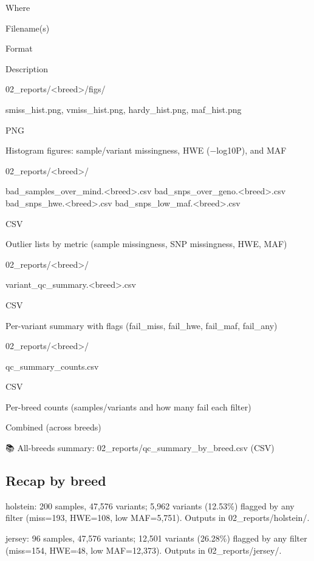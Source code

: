 \documentclass[
]{article}
\begin{document}
Where

Filename(s)

Format

Description

02\_reports/\textless breed\textgreater/figs/

smiss\_hist.png, vmiss\_hist.png, hardy\_hist.png, maf\_hist.png

PNG

Histogram figures: sample/variant missingness, HWE (−log10P), and MAF

02\_reports/\textless breed\textgreater/

bad\_samples\_over\_mind.\textless breed\textgreater.csv
bad\_snps\_over\_geno.\textless breed\textgreater.csv
bad\_snps\_hwe.\textless breed\textgreater.csv
bad\_snps\_low\_maf.\textless breed\textgreater.csv

CSV

Outlier lists by metric (sample missingness, SNP missingness, HWE, MAF)

02\_reports/\textless breed\textgreater/

variant\_qc\_summary.\textless breed\textgreater.csv

CSV

Per-variant summary with flags (fail\_miss, fail\_hwe, fail\_maf,
fail\_any)

02\_reports/\textless breed\textgreater/

qc\_summary\_counts.csv

CSV

Per-breed counts (samples/variants and how many fail each filter)

Combined (across breeds)

📚 All-breeds summary: 02\_reports/qc\_summary\_by\_breed.csv (CSV)

\subsection{Recap by breed}\label{recap-by-breed}

holstein: 200 samples, 47,576 variants; 5,962 variants (12.53\%) flagged
by any filter (miss=193, HWE=108, low MAF=5,751). Outputs in
02\_reports/holstein/.

jersey: 96 samples, 47,576 variants; 12,501 variants (26.28\%) flagged
by any filter (miss=154, HWE=48, low MAF=12,373). Outputs in
02\_reports/jersey/.
\end{document}

